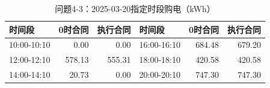 \begin{table}[H]\centering\small\caption{问题4-3：2025-03-20指定时段购电（kWh）}\label{tab:q4_320250320p}
\begin{tabular}{lrrlrr}\toprule
时间段 & 0时合同 & 执行合同 & 时间段 & 0时合同 & 执行合同\\\midrule
10:00-10:10 & 0.00 & 0.00 & 16:00-16:10 & 684.48 & 679.20\\
12:00-12:10 & 578.13 & 555.31 & 18:00-18:10 & 420.58 & 420.58\\
14:00-14:10 & 20.73 & 0.00 & 20:00-20:10 & 747.30 & 747.30\\
\bottomrule\end{tabular}\end{table}
